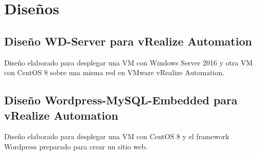 \chapter*{Diseños}
\label{chap:adicional}


% 
\section*{Diseño WD-Server para vRealize Automation}
\label{appendix:wd-server-blueprint}
Diseño elaborado para desplegar una VM con Windows Server 2016 y otra VM con CentOS 8 sobre una misma red en VMware vRealize Automation.


\section*{Diseño Wordpress-MySQL-Embedded para vRealize Automation}
\label{appendix:worpress-mysql-blueprint}
Diseño elaborado para desplegar una VM con CentOS 8 y el framework Wordpress preparado para crear un sitio web.

